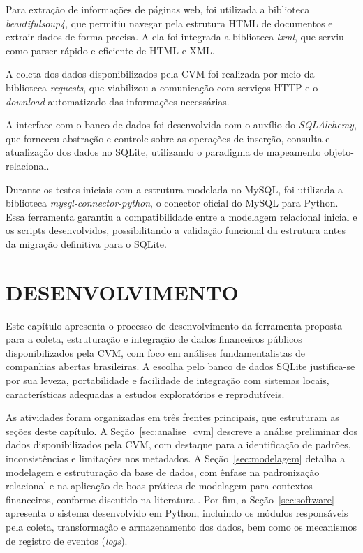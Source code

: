 \documentclass[recuosum=1.5cm]{iftex2024}
\begin{document}
Para extração de informações de páginas web, foi utilizada a biblioteca \textit{beautifulsoup4}, que permitiu navegar pela estrutura HTML de documentos e extrair dados de forma precisa. A ela foi integrada a biblioteca \textit{lxml}, que serviu como parser rápido e eficiente de HTML e XML.

A coleta dos dados disponibilizados pela CVM foi realizada por meio da biblioteca \textit{requests}, que viabilizou a comunicação com serviços HTTP e o \textit{download} automatizado das informações necessárias.

A interface com o banco de dados foi desenvolvida com o auxílio do \textit{SQLAlchemy}, que forneceu abstração e controle sobre as operações de inserção, consulta e atualização dos dados no SQLite, utilizando o paradigma de mapeamento objeto-relacional.

Durante os testes iniciais com a estrutura modelada no MySQL, foi utilizada a biblioteca \textit{mysql-connector-python}, o conector oficial do MySQL para Python. Essa ferramenta garantiu a compatibilidade entre a modelagem relacional inicial e os scripts desenvolvidos, possibilitando a validação funcional da estrutura antes da migração definitiva para o SQLite.
\chapter{DESENVOLVIMENTO}

Este capítulo apresenta o processo de desenvolvimento da ferramenta proposta para a coleta, estruturação e integração de dados financeiros públicos disponibilizados pela CVM, com foco em análises fundamentalistas de companhias abertas brasileiras. A escolha pelo banco de dados SQLite justifica-se por sua leveza, portabilidade e facilidade de integração com sistemas locais, características adequadas a estudos exploratórios e reprodutíveis.

As atividades foram organizadas em três frentes principais, que estruturam as seções deste capítulo. A Seção~\ref{sec:analise_cvm} descreve a análise preliminar dos dados disponibilizados pela CVM, com destaque para a identificação de padrões, inconsistências e limitações nos metadados. A Seção~\ref{sec:modelagem} detalha a modelagem e estruturação da base de dados, com ênfase na padronização relacional e na aplicação de boas práticas de modelagem para contextos financeiros, conforme discutido na literatura \cite{elmasri:2016:fundamentals}. Por fim, a Seção~\ref{sec:software} apresenta o sistema desenvolvido em Python, incluindo os módulos responsáveis pela coleta, transformação e armazenamento dos dados, bem como os mecanismos de registro de eventos (\textit{logs}).
\end{document}

